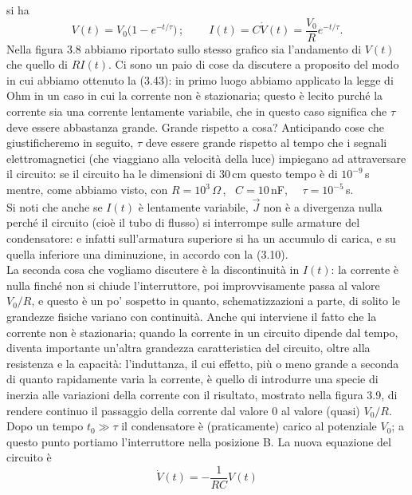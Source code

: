 si ha
\begin{equation}
  V(t)=V_0\big(1-e^{-t/\tau}\big)\,;
  \qquad\ I(t)=C\dot V(t)=\frac{V_0}{R}e^{-t/\tau}.
  \tag{3.43}
\end{equation}
Nella figura 3.8 abbiamo riportato sullo stesso grafico sia l'andamento di
$V(t)$ che quello di $RI(t)$.
Ci sono un paio di cose da discutere a proposito del modo in cui abbiamo
ottenuto la (3.43): in primo luogo abbiamo applicato la legge di Ohm in un caso
in cui la corrente non \`e stazionaria; questo \`e lecito purch\'e la corrente
sia una corrente lentamente variabile, che in questo caso significa che $\tau$
deve essere abbastanza grande. Grande rispetto a cosa? Anticipando cose che
giustificheremo in seguito, $\tau$ deve essere grande rispetto al tempo che i
segnali elettromagnetici (che viaggiano alla velocit\`a della luce) impiegano ad
attraversare il circuito: se il circuito ha le dimensioni di 30\,cm questo tempo
\`e di $10^{-9}$\,s mentre, come abbiamo visto, con $R=10^3\,\Omega$\,,
\ $C=10$\,nF, \ \ $\tau=10^{-5}$\,s.\\
Si noti che anche se $I(t)$ \`e lentamente variabile, $\vec J$ non \`e a
divergenza nulla perch\'e il circuito (cio\`e il tubo di flusso) si interrompe
sulle armature del condensatore: e infatti sull'armatura superiore si ha un
accumulo di carica, e su quella inferiore una diminuzione, in accordo con la
(3.10).\\
La seconda cosa che vogliamo discutere \`e la discontinuit\`a in $I(t)$: la
corrente \`e nulla finch\'e non si chiude l'interruttore, poi improvvisamente
passa al valore $V_0/R$, e questo \`e un po' sospetto in quanto,
schematizzazioni a parte, di solito le grandezze fisiche variano con
continuit\`a. Anche qui interviene il fatto che la corrente non \`e stazionaria;
quando la corrente in un circuito dipende dal tempo, diventa importante un'altra
grandezza caratteristica del circuito, oltre alla resistenza e la capacit\`a:
l'induttanza, il cui effetto, pi\`u o meno grande a seconda di quanto
rapidamente varia la corrente, \`e quello di introdurre una specie di inerzia
alle variazioni della corrente con il risultato, mostrato nella figura 3.9, di
rendere continuo il passaggio della corrente dal valore 0 al valore (quasi)
$V_0/R$.
Dopo un tempo $t_0\gg\tau$ il condensatore \`e (praticamente) carico al
potenziale $V_0$; a questo punto portiamo l'interruttore nella posizione B. La
nuova equazione del circuito \`e
\begin{equation}
  \dot V(t)=-\frac{1}{RC}V(t)
  \tag{3.44}
\end{equation}
